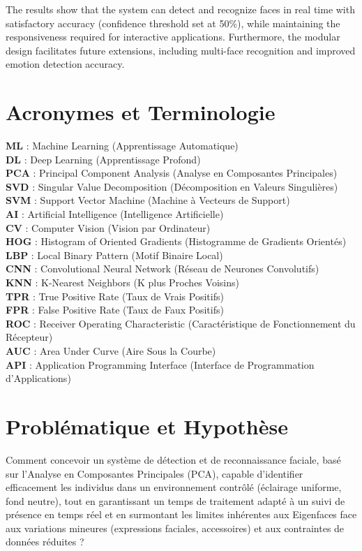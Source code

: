 \documentclass[a4paper,12pt]{report} %
\begin{document}
The results show that the system can detect and recognize faces in real time with satisfactory accuracy (confidence threshold set at 50\%), while maintaining the responsiveness required for interactive applications. Furthermore, the modular design facilitates future extensions, including multi-face recognition and improved emotion detection accuracy.


\chapter{Acronymes et Terminologie}
\textbf{ML} : Machine Learning (Apprentissage Automatique) \\
\textbf{DL} : Deep Learning (Apprentissage Profond) \\
\textbf{PCA} : Principal Component Analysis (Analyse en Composantes Principales) \\
\textbf{SVD} : Singular Value Decomposition (Décomposition en Valeurs Singulières) \\
\textbf{SVM} : Support Vector Machine (Machine à Vecteurs de Support) \\
\textbf{AI} : Artificial Intelligence (Intelligence Artificielle) \\
\textbf{CV} : Computer Vision (Vision par Ordinateur) \\
\textbf{HOG} : Histogram of Oriented Gradients (Histogramme de Gradients Orientés) \\
\textbf{LBP} : Local Binary Pattern (Motif Binaire Local) \\
\textbf{CNN} : Convolutional Neural Network (Réseau de Neurones Convolutifs) \\
\textbf{KNN} : K-Nearest Neighbors (K plus Proches Voisins) \\
\textbf{TPR} : True Positive Rate (Taux de Vrais Positifs) \\
\textbf{FPR} : False Positive Rate (Taux de Faux Positifs) \\
\textbf{ROC} : Receiver Operating Characteristic (Caractéristique de Fonctionnement du Récepteur) \\
\textbf{AUC} : Area Under Curve (Aire Sous la Courbe) \\
\textbf{API} : Application Programming Interface (Interface de Programmation d'Applications) \\

\tableofcontents
\newpage

\chapter{Problématique et Hypothèse}
\begin{block}[Problématique]
Comment concevoir un système de détection et de reconnaissance faciale, basé sur l'Analyse en Composantes Principales (PCA), capable d'identifier efficacement les individus dans un environnement contrôlé (éclairage uniforme, fond neutre), tout en garantissant un temps de traitement adapté à un suivi de présence en temps réel et en surmontant les limites inhérentes aux Eigenfaces face aux variations mineures (expressions faciales, accessoires) et aux contraintes de données réduites ?
\end{block}
\end{document}
